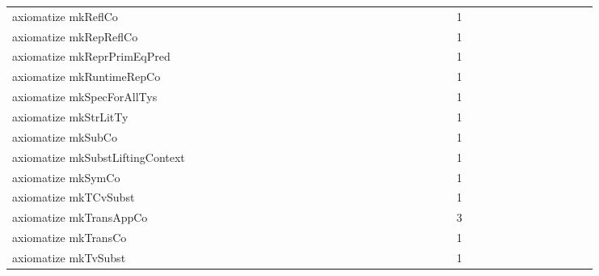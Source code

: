 {\begin{tabular}{l|rrr|rrr|rrr}
axiomatize mkReflCo &  &  &  &  &  &  &  &  &  &  &  &  &  &  &  &  &  &  &  &  &  &  &  & 1 &  &  &  &  &  &  &  &  &  &  &  & \\
axiomatize mkRepReflCo &  &  &  &  &  &  &  &  &  &  &  &  &  &  &  &  &  &  &  &  &  &  &  & 1 &  &  &  &  &  &  &  &  &  &  &  & \\
axiomatize mkReprPrimEqPred &  &  &  &  &  &  &  &  &  &  &  &  &  &  &  &  &  &  &  &  &  &  &  & 1 &  &  &  &  &  &  &  &  &  &  &  & \\
axiomatize mkRuntimeRepCo &  &  &  &  &  &  &  &  &  &  &  &  &  &  &  &  &  &  &  &  &  &  &  & 1 &  &  &  &  &  &  &  &  &  &  &  & \\
axiomatize mkSpecForAllTys &  &  &  &  &  &  &  &  &  &  &  &  &  &  &  &  &  &  &  &  &  &  &  & 1 &  &  &  &  &  &  &  &  &  &  &  & \\
axiomatize mkStrLitTy &  &  &  &  &  &  &  &  &  &  &  &  &  &  &  &  &  &  &  &  &  &  &  & 1 &  &  &  &  &  &  &  &  &  &  &  & \\
axiomatize mkSubCo &  &  &  &  &  &  &  &  &  &  &  &  &  &  &  &  &  &  &  &  &  &  &  & 1 &  &  &  &  &  &  &  &  &  &  &  & \\
axiomatize mkSubstLiftingContext &  &  &  &  &  &  &  &  &  &  &  &  &  &  &  &  &  &  &  &  &  &  &  & 1 &  &  &  &  &  &  &  &  &  &  &  & \\
axiomatize mkSymCo &  &  &  &  &  &  &  &  &  &  &  &  &  &  &  &  &  &  &  &  &  &  &  & 1 &  &  &  &  &  &  &  &  &  &  &  & \\
axiomatize mkTCvSubst &  &  &  &  &  &  &  &  &  &  &  &  &  &  &  &  &  &  &  &  &  &  &  & 1 &  &  &  &  &  &  &  &  &  &  &  & \\
axiomatize mkTransAppCo &  &  &  &  &  &  &  &  &  &  &  &  &  &  &  &  &  &  &  &  &  &  &  & 3 &  &  &  &  &  &  &  &  &  &  &  & \\
axiomatize mkTransCo &  &  &  &  &  &  &  &  &  &  &  &  &  &  &  &  &  &  &  &  &  &  &  & 1 &  &  &  &  &  &  &  &  &  &  &  & \\
axiomatize mkTvSubst &  &  &  &  &  &  &  &  &  &  &  &  &  &  &  &  &  &  &  &  &  &  &  & 1 &  &  &  &  &  &  &  &  &  &  &  & \\

\end{tabular}}
